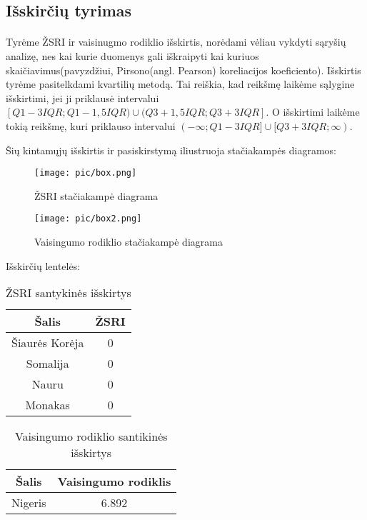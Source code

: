 \subsection{Išskirčių tyrimas}
\paragraph{} Tyrėme ŽSRI ir vaisinugmo rodiklio išskirtis, norėdami vėliau vykdyti sąryšių analizę, nes kai kurie duomenys gali iškraipyti kai kuriuos skaičiavimus(pavyzdžiui, Pirsono(angl. Pearson) koreliacijos koeficiento). 
Išskirtis tyrėme pasitelkdami kvartilių metodą. Tai reiškia, kad reikšmę laikėme sąlygine išskirtimi, jei ji priklausė intervalui $[Q1-3IQR; Q1-1,5IQR) \cup (Q3+1,5IQR; Q3+3IQR]$. O išskirtimi laikėme tokią reikšmę, kuri priklauso intervalui $(-\infty; Q1-3IQR] \cup [Q3+3IQR; \infty)$. \\\par
Šių kintamųjų išskirtis ir pasiskirstymą iliustruoja stačiakampės diagramos:

\begin{multicols}{2}
    \begin{figure}[H]
        \centering
        \texttt{[image: pic/box.png]}
        \caption{ŽSRI stačiakampė diagrama}
    \end{figure}
    \begin{figure}[H]
        \centering
        \texttt{[image: pic/box2.png]}
        \caption{Vaisingumo rodiklio stačiakampė diagrama}
    \end{figure}
\end{multicols}

Išskirčių lentelės:
\begin{multicols}{2}
\begin{table}[H]
\begin{center}
    \caption{ŽSRI santykinės išskirtys}
    \begin{tabular}{c c}
        \hline
        \textbf{Šalis} & \textbf{ŽSRI} \\\hline
        Šiaurės Korėja & 0 \\
        Somalija & 0 \\
        Nauru & 0 \\
        Monakas & 0 \\\hline
    \end{tabular}
\end{center}
\end{table}

\begin{table}[H]
\begin{center}
    \caption{Vaisingumo rodiklio santikinės išskirtys}
    \begin{tabular}{c c}
        \hline
        \textbf{Šalis} & \textbf{Vaisingumo rodiklis} \\\hline
        Nigeris & 6.892 \\\hline
    \end{tabular}
\end{center}
\end{table}
\end{multicols}

